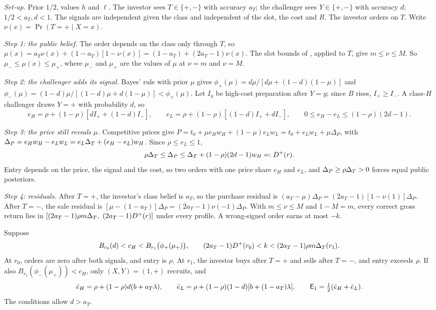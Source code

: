 \emph{Set-up.} Prior \(1/2\), values \(h\) and \(\ell\). The investor sees \(T\in\{+,-\}\) with accuracy \(a_T\); the
challenger sees \(Y\in\{+,-\}\) with accuracy \(d\); \(1/2<a_T,d<1\). The signals are independent given the class and
independent of the slot, the cost and \(R\). The investor orders on \(T\). Write \(\nu(x)=\Pr(T=+\mid X=x)\).

\emph{Step 1: the public belief.} The order depends on the class only through \(T\), so
\(\mu(x)=a_T\nu(x)+(1-a_T)[1-\nu(x)]=(1-a_T)+(2a_T-1)\nu(x)\). The slot bounds of ,
applied to \(T\), give \(m\le\nu\le M\). So \(\mu_-\le\mu(x)\le\mu_+\), where \(\mu_-\) and \(\mu_+\) are the values of \(\mu\) at \(\nu=m\) and
\(\nu=M\).

\emph{Step 2: the challenger adds its signal.} Bayes' rule with prior \(\mu\) gives
\(\phi_+(\mu)=d\mu/[d\mu+(1-d)(1-\mu)]\) and \(\phi_-(\mu)=(1-d)\mu/[(1-d)\mu+d(1-\mu)]<\phi_+(\mu)\). Let \(I_y\) be
high-cost preparation after \(Y=y\); since \(B\) rises, \(I_+\ge I_-\). A class-\(H\) challenger draws \(Y=+\) with
probability \(d\), so
\[
e_H=\rho+(1-\rho)[dI_++(1-d)I_-],\qquad e_L=\rho+(1-\rho)[(1-d)I_++dI_-],\qquad
0\le e_H-e_L\le(1-\rho)(2d-1).
\]

\emph{Step 3: the price still reveals \(\mu\).} Competitive prices give
\(P=t_0+\mu e_Hw_H+(1-\mu)e_Lw_L=t_0+e_Lw_L+\mu\Delta_P\), with \(\Delta_P=e_Hw_H-e_Lw_L=e_L\Delta_T+(e_H-e_L)w_H\). Since
\(\rho\le e_L\le1\),
\[
\rho\Delta_T\le\Delta_P\le\Delta_T+(1-\rho)(2d-1)w_H=:D^+(r).
\]
Entry depends on the price, the signal and the cost, so two orders with one price share \(e_H\) and \(e_L\), and
\(\Delta_P\ge\rho\Delta_T>0\) forces equal public posteriors.

\emph{Step 4: residuals.} After \(T=+\), the investor's class belief is \(a_T\), so the purchase residual is
\((a_T-\mu)\Delta_P=(2a_T-1)[1-\nu(1)]\Delta_P\). After \(T=-\), the sale residual is
\([\mu-(1-a_T)]\Delta_P=(2a_T-1)\nu(-1)\Delta_P\). With \(m\le\nu\le M\) and \(1-M=m\), every correct gross return lies in
\([(2a_T-1)\rho m\Delta_T,\ (2a_T-1)D^+(r)]\) under every profile. A wrong-signed order earns at most \(-k\).

\begin{resultbox}
Suppose
\[
B_{r_0}(d)<c_H<B_{r_1}\bigl(\phi_+(\mu_+)\bigr),\qquad (2a_T-1)D^+(r_0)<k<(2a_T-1)\rho m\Delta_T(r_1).
\]
At \(r_0\), orders are zero after both signals, and entry is \(\rho\). At \(r_1\), the investor buys after \(T=+\) and
sells after \(T=-\), and entry exceeds \(\rho\). If also \(B_{r_1}(\phi_-(\mu_+))<c_H\), only \((X,Y)=(1,+)\) recruits,
and
\[
\bar e_H=\rho+(1-\rho)d(b+a_T\lambda),\qquad \bar e_L=\rho+(1-\rho)(1-d)[b+(1-a_T)\lambda],\qquad
\mathsf{E}_1=\tfrac12(\bar e_H+\bar e_L).
\]
The conditions allow \(d>a_T\).
\end{resultbox}

